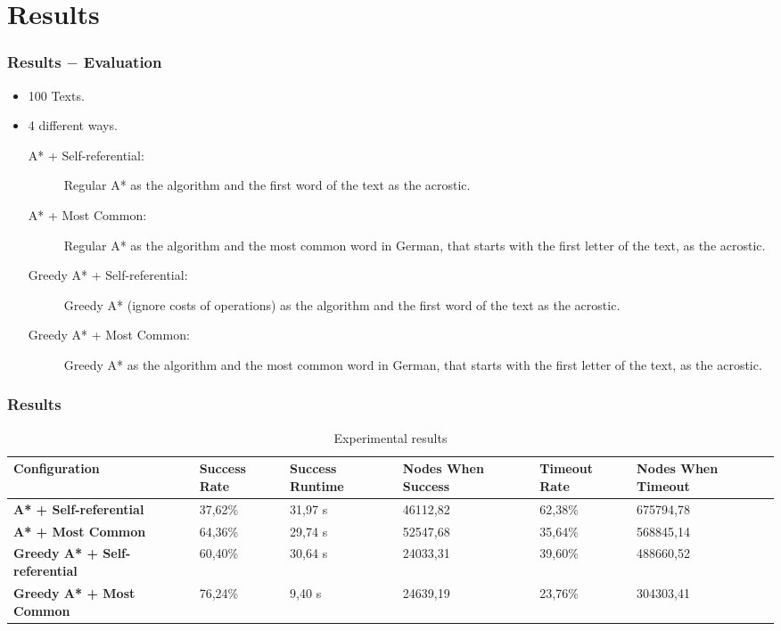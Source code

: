\documentclass{beamer}
\begin{document}
\section{Results}
\begin{frame}
\frametitle{Results $-$ Evaluation}
\begin{itemize}
	\item 100 Texts.
	\item 4 different ways.
		\begin{description}
			\item[A* + Self-referential:] Regular A* as the algorithm and the first word of the text as the acrostic.
			\item[A* + Most Common:] Regular A* as the algorithm and the most common word in German, that starts with the first letter of the text, as the acrostic.
			\item[Greedy A* + Self-referential:] Greedy A* (ignore costs of operations) as the algorithm and the first word of the text as the acrostic.
			\item[Greedy A* + Most Common:] Greedy A* as the algorithm and the most common word in German, that starts with the first letter of the text, as the acrostic.
		\end{description}
\end{itemize}
\end{frame}

\begin{frame}
\frametitle{Results}

\begin{small}
\begin{table}[h]
\centering
\begin{tabular}{p{2.4cm} | p{1.3cm} | p{1.3cm} | p{1.3cm} | p{1.3cm} | p{1.3cm}}
	\hline
	\textbf{Configuration} & \textbf{Success Rate} & \textbf{Success Runtime} & \textbf{Nodes When Success} & \textbf{Timeout Rate} & \textbf{Nodes When Timeout} \\ \hline
	\textbf{A* + Self-referential}	& 37,62\%	& 31,97 s	& 46112,82	& 62,38\%	& 675794,78 \\ \hline
	\textbf{A* + Most Common}		& 64,36\%	& 29,74 s	& 52547,68	& 35,64\%	& 568845,14 \\ \hline
	\textbf{Greedy A* + Self-referential}	& 60,40\%	& 30,64 s	& 24033,31	& 39,60\%	& 488660,52 \\ \hline
	\textbf{Greedy A* + Most Common}	& 76,24\%	& 9,40 s	& 24639,19	& 23,76\%	& 304303,41 \\ \hline
\end{tabular}
\label{tab:results}
\caption{Experimental results}
\end{table}
\end{small}

\end{frame}
\end{document}

